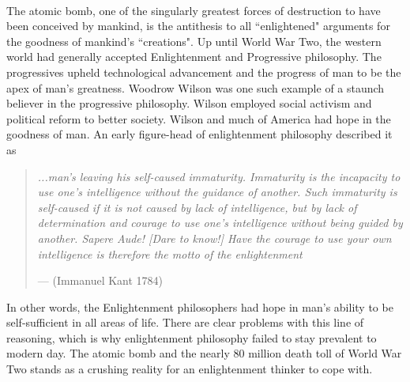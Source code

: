 \documentclass[10pt]{article}
\begin{document}
\paragraph{}
The atomic bomb, one of the singularly greatest forces of destruction to have been conceived by mankind, is the antithesis to all ``enlightened" arguments for the goodness of mankind's ``creations". Up until World War Two, the western world had generally accepted Enlightenment and Progressive philosophy. The progressives upheld technological advancement and the progress of man to be the apex of man's greatness. Woodrow Wilson was one such example of a staunch believer in the progressive philosophy. Wilson employed social activism and political reform to better society. Wilson and much of America had hope in the goodness of man. An early figure-head of enlightenment philosophy described it as
{\small \begin{quote}
	\centering
	\textit{...man's leaving his self-caused immaturity. Immaturity is the incapacity to use one's	intelligence without the guidance of another. Such immaturity is self-caused if it is not caused by lack of intelligence, but by lack of determination and courage to use one's intelligence without being guided by another. Sapere Aude! [Dare to know!] Have the courage to use your own intelligence is therefore the motto of the enlightenment}
	\begin{flushright}
		--- (Immanuel Kant 1784)\textsuperscript{\cite{Kant1804}}
	\end{flushright}
\end{quote}}
In other words, the Enlightenment philosophers had hope in man's ability to be self-sufficient in all areas of life. There are clear problems with this line of reasoning, which is why enlightenment philosophy failed to stay prevalent to modern day. The atomic bomb and the nearly 80 million death toll of World War Two stands as a crushing reality for an enlightenment thinker to cope with. 
\end{document}
